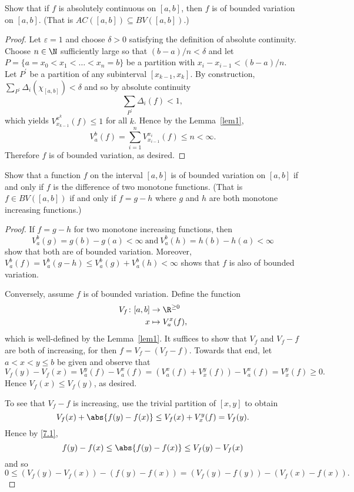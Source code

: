 \documentclass[12pt]{amsart}
\begin{document}
\begin{thm}\label{ex6}
  Show that if $f$ is absolutely continuous on $[a,b]$, then $f$ is of bounded variation on $[a,b]$. (That is $AC([a,b]) \subseteq BV([a,b])$.)
  
  \begin{proof}
    Let $\varepsilon = 1$ and choose $\delta > 0$ satisfying the definition of absolute continuity.
    Choose $n \in \N$ sufficiently large so that $(b - a) / n < \delta$ and let $P = \{a = x_0 < x_1 < \ldots < x_n = b\}$ be a partition with $x_i - x_{i-1} < (b-a)/n$.
    Let $P^\prime$ be a partition of any subinterval $[x_{k-1}, x_k]$.
    By construction, $\sum_{P^\prime} \Delta_i(\chi_{[a,b]}) < \delta$ and so by absolute continuity
    $$\sum_{P^\prime} \Delta_i(f) < 1,$$ 
    which yields $V_{x_{k-1}}^{x^k}(f) \leq 1$ for all $k$.
    Hence by the Lemma~\ref{lem1}, 
    $$V_a^b(f) = \sum_{i = 1}^n V_{x_{i-1}}^{x_i}(f) \leq n < \infty.$$
    Therefore $f$ is of bounded variation, as desired.
  \end{proof}
\end{thm}

\newpage

\begin{thm}\label{ex7}
  Show that a function $f$ on the interval $[a,b]$ is of bounded variation on $[a,b]$ if and only if $f$ is the difference of two monotone functions. 
  (That is $f \in BV([a,b])$ if and only if $f = g - h$ where $g$ and $h$ are both monotone increasing functions.)
  \begin{proof}
    If $f = g - h$ for two monotone increasing functions, then 
    $$V_a^b(g) = g(b) - g(a) < \infty\ \text{and}\ V_a^b(h) = h(b) - h(a) < \infty$$
    show that both are of bounded variation.
    Moreover, $V_a^b(f) = V_a^b(g - h) \leq V_a^b(g) + V_a^b(h) < \infty$ shows that $f$ is also of bounded variation.
    
    Conversely, assume $f$ is of bounded variation.
    Define the function
    \begin{align*}
      V_f \colon [a,b] &\rightarrow \R^{\geq 0}\\
      x &\mapsto V_a^x(f),
    \end{align*}
    which is well-defined by the Lemma~\ref{lem1}.
    It suffices to show that $V_f$ and $V_f - f$ are both of increasing, for then $f = V_f - (V_f - f)$.
    Towards that end, let $a < x < y \leq b$ be given and observe that
    $$ V_f(y) - V_f(x) = V_a^y(f) - V_a^x(f) = (V_a^x(f) + V_x^y(f)) - V_a^x(f) = V_x^y(f) \geq 0.$$
    Hence $V_f(x) \leq V_f(y)$, as desired.
    
    To see that $V_f - f$ is increasing, use the trivial partition of $[x,y]$ to obtain
    \begin{equation}\label{7.1}
      V_f(x) + \abs{f(y) - f(x)} \leq V_f(x) + V_x^y(f) = V_f(y).
    \end{equation}
    Hence by \eqref{7.1}, 
    $$ f(y) - f(x) \leq \abs{f(y) - f(x)} \leq V_f(y) - V_f(x)$$
    and so
    $$0 \leq \left(V_f(y) - V_f(x)\right) - \left(f(y) - f(x)\right) = \left(V_f(y) - f(y)\right) - \left(V_f(x) - f(x)\right).$$
  \end{proof}
\end{thm}
\end{document}
